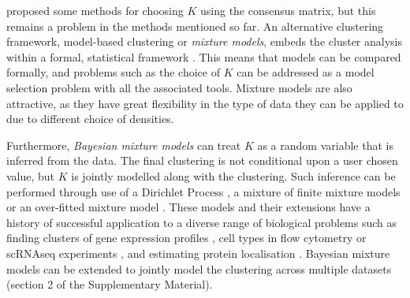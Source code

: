 \documentclass[12pt]{article}
\begin{document}

\cite{monti2003consensus} proposed some methods for choosing $K$ using the consensus matrix, but this remains a problem in the methods mentioned so far. An alternative clustering framework, model-based clustering or \emph{mixture models}, embeds the cluster analysis within a formal, statistical framework \citep{fraley2002model}. This means that models can be compared formally, and problems such as the choice of $K$ can be addressed as a model selection problem with all the associated tools. Mixture models are also attractive, as they have great flexibility in the type of data they can be applied to due to different choice of densities.

Furthermore, \emph{Bayesian mixture models} can treat $K$ as a random variable that is inferred from the data. The final clustering is not conditional upon a user chosen value, but $K$ is jointly modelled along with the clustering. Such inference can be performed through use of a Dirichlet Process \citep{ferguson1973bayesian}, a mixture of finite mixture models \citep{richardson1997bayesian, miller2018mixture} or an over-fitted mixture model \citep{rousseau2011asymptotic}. These models and their extensions have a history of successful application to a diverse range of biological problems such as finding clusters of gene expression profiles \citep{medvedovic2002bayesian}, cell types in flow cytometry \citep{chan2008statistical, hejblum2019sequential} or scRNAseq experiments \citep{prabhakaran2016dirichlet}, and estimating protein localisation \citep{crook2018bayesian}. Bayesian mixture models can be extended to jointly model the clustering across multiple datasets \citep{kirk2012bayesian, gabasova2017clusternomics} (section 2 of the Supplementary Material).
\end{document}
